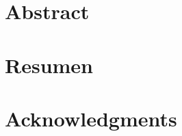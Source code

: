 \documentclass[a4paper, 10pt, openright]{report}
\begin{document}

\thispagestyle{empty}
\phantom{a}
\vfill
\newpage


\setlength{\parskip}{5pt}
\setcounter{page}{1}

\chapter*{\huge{Abstract}}
\newpage
%
\chapter*{\huge{Resumen}}
\newpage
%
\chapter*{\huge{Acknowledgments}}
\newpage
%
\end{document}
